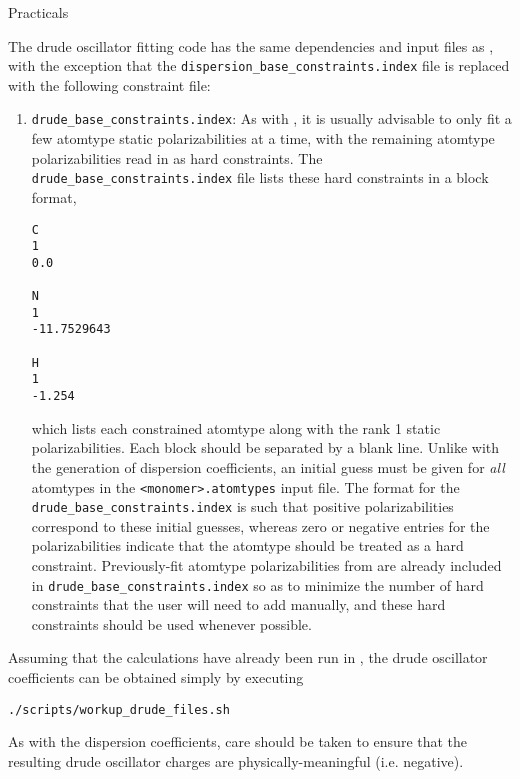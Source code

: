 \begin{paragraph}{Practicals}

The drude oscillator fitting code has the same dependencies and input files as
\idma, with the exception that the \verb|dispersion_base_constraints.index|
file is replaced with the following constraint file:
\begin{enumerate}
\item \verb|drude_base_constraints.index|: As with \idma,
it is usually advisable to only fit a few atomtype static polarizabilities at a
time, with the remaining atomtype polarizabilities read in as hard
constraints. The \verb|drude_base_constraints.index| file lists these
hard constraints in a block format, 

\begin{minipage}{\linewidth}
\begin{lstlisting}
C
1
0.0

N     
1
-11.7529643 

H     
1
-1.254

\end{lstlisting}
\end{minipage}
which lists each constrained atomtype along with the rank 1 static
polarizabilities. Each block should be separated by a blank line. Unlike with the generation of
dispersion coefficients, an initial guess must be given for \emph{all}
atomtypes in the \verb|<monomer>.atomtypes| input file.
The format for the  \verb|drude_base_constraints.index| is such that
positive polarizabilities correspond to these initial guesses, whereas zero or
negative entries for the polarizabilities indicate that the atomtype should be
treated as a hard constraint.
Previously-fit atomtype polarizabilities from  are already included in 
\verb|drude_base_constraints.index| so as to minimize the number of hard
constraints that the user will need to add manually, and these hard
constraints should be used whenever possible.
\end{enumerate}

Assuming that the \idma calculations have already been run in \camcasp, the
drude oscillator coefficients can be obtained simply by executing
%
\begin{lstlisting}
./scripts/workup_drude_files.sh
\end{lstlisting}
%
As with the dispersion coefficients, care should be taken to ensure that the
resulting drude oscillator charges are physically-meaningful (i.e. negative).

\end{paragraph}
